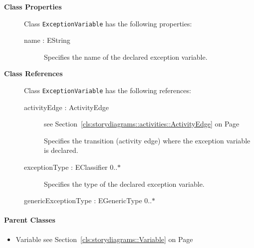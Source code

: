 	


\begin{description}

	\item[\textbf{Class Properties}] Class \texttt{ExceptionVariable} has the following properties:
	\begin{description}
\item[name : EString 	]

\hspace{\fill}
\nopagebreak


	
			
Specifies the name of the declared exception variable.	
		
	
	\end{description}
	
	\item[\textbf{Class References}] Class \texttt{ExceptionVariable} has the following references:
	\begin{description}
\item[activityEdge : ActivityEdge 	]
see Section~\ref{cls:storydiagrams::activities::ActivityEdge} on Page~\pageref{cls:storydiagrams::activities::ActivityEdge}
\hspace{\fill}
\nopagebreak


	
			
Specifies the transition (activity edge) where the exception variable is declared.	
		
	
\item[exceptionType : EClassifier 			0..$*$]

\hspace{\fill}
\nopagebreak


	
			
Specifies the type of the declared exception variable.	
		
	
\item[genericExceptionType : EGenericType 			0..$*$]

\hspace{\fill}
\nopagebreak


	
	\end{description}
	

\end{description}

\paragraph{Parent Classes}
\begin{itemize}
\item Variable see Section~\ref{cls:storydiagrams::Variable} on Page~\pageref{cls:storydiagrams::Variable}\end{itemize}
